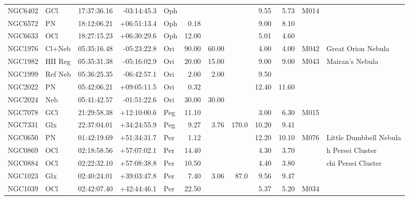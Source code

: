 \documentclass[11pt]{article}
\begin{document}
\begin{longtable}{llrrlrrrrrrl}
  NGC6402 & GCl     & 17:37:36.16 & -03:14:45.3 & Oph   &        &        &       & 9.55  & 5.73  & M014    &                                \\
  NGC6572 & PN      & 18:12:06.21 & +06:51:13.4 & Oph   & 0.18   &        &       & 9.00  & 8.10  &         &                                \\
  NGC6633 & OCl     & 18:27:15.23 & +06:30:29.6 & Oph   & 12.00  &        &       & 5.01  & 4.60  &         &                                \\
  NGC1976 & Cl+Neb  & 05:35:16.48 & -05:23:22.8 & Ori   & 90.00  & 60.00  &       & 4.00  & 4.00  & M042    & Great Orion Nebula             \\
  NGC1982 & HII Reg & 05:35:31.38 & -05:16:02.9 & Ori   & 20.00  & 15.00  &       & 9.00  & 9.00  & M043    & Mairan's Nebula                \\
  NGC1999 & Ref Neb & 05:36:25.35 & -06:42:57.1 & Ori   & 2.00   & 2.00   &       & 9.50  &       &         &                                \\
  NGC2022 & PN      & 05:42:06.21 & +09:05:11.5 & Ori   & 0.32   &        &       & 12.40 & 11.60 &         &                                \\
  NGC2024 & Neb     & 05:41:42.57 & -01:51:22.6 & Ori   & 30.00  & 30.00  &       &       &       &         &                                \\
  NGC7078 & GCl     & 21:29:58.38 & +12:10:00.6 & Peg   & 11.10  &        &       & 3.00  & 6.30  & M015    &                                \\
  NGC7331 & Glx     & 22:37:04.01 & +34:24:55.9 & Peg   & 9.27   & 3.76   & 170.0 & 10.20 & 9.41  &         &                                \\
  NGC0650 & PN      & 01:42:19.69 & +51:34:31.7 & Per   & 1.12   &        &       & 12.20 & 10.10 & M076    & Little Dumbbell Nebula         \\
  NGC0869 & OCl     & 02:18:58.56 & +57:07:02.1 & Per   & 14.40  &        &       & 4.30  & 3.70  &         & h Persei Cluster               \\
  NGC0884 & OCl     & 02:22:32.10 & +57:08:38.8 & Per   & 10.50  &        &       & 4.40  & 3.80  &         & chi Persei Cluster             \\
  NGC1023 & Glx     & 02:40:24.01 & +39:03:47.8 & Per   & 7.40   & 3.06   & 87.0  & 9.56  & 9.47  &         &                                \\
  NGC1039 & OCl     & 02:42:07.40 & +42:44:46.1 & Per   & 22.50  &        &       & 5.37  & 5.20  & M034    &                                \\

\end{longtable}
\end{document}
